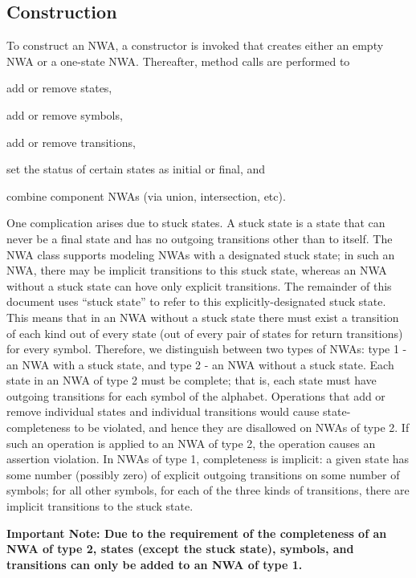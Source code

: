\subsection{Construction}
\label{Se:Construction}

To construct an NWA, a constructor is invoked that creates either an empty
NWA or a one-state NWA.  Thereafter, method calls are performed
to \begin{inparaenum} \item add or remove states, \item add or remove
  symbols, \item add or remove transitions, \item set the status of certain
  states as initial or final, and \item combine component NWAs (via union,
  intersection, etc). \end{inparaenum}


One complication arises due to stuck states.  A stuck state is a state that
can never be a final state and has no outgoing transitions other than to
itself.  The NWA class supports modeling NWAs with a designated stuck state;
in such an NWA, there may be implicit transitions to this stuck state,
whereas an NWA without a stuck state can hove only explicit transitions.  The
remainder of this document uses ``stuck state'' to refer to this
explicitly-designated stuck state.  This means that in an NWA without a stuck
state there must exist a transition of each kind out of every state (out of
every pair of states for return transitions) for every symbol.  Therefore, we
distinguish between two types of NWAs: type 1 - an NWA with a stuck state,
and type 2 - an NWA without a stuck state.  Each state in an NWA of type 2
must be complete; that is, each state must have outgoing transitions for each
symbol of the alphabet.  Operations that add or remove individual states and
individual transitions would cause state-completeness to be violated, and
hence they are disallowed on NWAs of type 2.  If such an operation is applied
to an NWA of type 2, the operation causes an assertion violation.  In NWAs of
type 1, completeness is implicit: a given state has some number (possibly
zero) of explicit outgoing transitions on some number of symbols; for all
other symbols, for each of the three kinds of transitions, there are implicit
transitions to the stuck state.

\textbf{Important Note: Due to the requirement of the completeness of an NWA
  of type 2, states (except the stuck state), symbols, and transitions can
  only be added to an NWA of type 1.}

